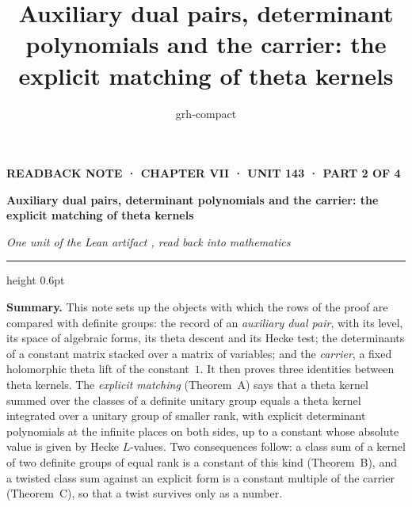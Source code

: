 \documentclass[11pt,a4paper]{article}
\title{Auxiliary dual pairs, determinant polynomials and the carrier: the explicit matching of theta kernels}
\author{grh-compact}
\date{}
\theoremstyle{plainx}
\theoremstyle{uprightx}
\begin{document}
\color{ink}

{\raggedright
{\sffamily\bfseries\fontsize{7.2}{9}\selectfont\color{leancol}READBACK NOTE · CHAPTER VII · UNIT 143 · PART 2 OF 4\par}
\vspace{5pt}
{\fontsize{21.5}{25.5}\selectfont\bfseries Auxiliary dual pairs, determinant polynomials and the carrier: the explicit
matching of theta kernels\par}
\vspace{5pt}
{\fontsize{12.4}{16}\selectfont\itshape\color{inksoft} One unit of the Lean artifact \ArtifactName, read back into
mathematics\par}}
\vspace{8pt}
{\color{rulegrey}\hrule height 0.6pt}
\vspace{7pt}
\thispagestyle{empty}

\textbf{Summary.} This note sets up the objects with which the rows of the proof are compared with definite
groups: the record of an \emph{auxiliary dual pair}, with its level, its space of algebraic forms, its theta descent
and its Hecke test; the determinants of a constant matrix stacked over a matrix of variables; and the \emph{carrier},
a fixed holomorphic theta lift of the constant~$1$. It then proves three identities between theta kernels. The
\emph{explicit matching} (Theorem~A) says that a theta kernel summed over the classes of a definite unitary group
equals a theta kernel integrated over a unitary group of smaller rank, with explicit determinant polynomials at the
infinite places on both sides, up to a constant whose absolute value is given by Hecke $L$-values. Two consequences
follow: a class sum of a kernel of two definite groups of equal rank is a constant of this kind (Theorem~B), and a
twisted class sum against an explicit form is a constant multiple of the carrier (Theorem~C), so that a twist
survives only as a number.
\end{document}
